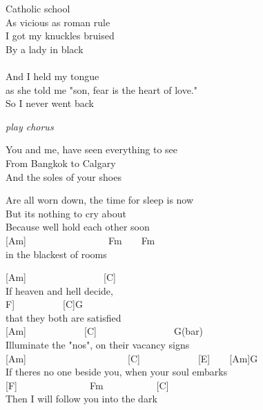 \documentclass[
  letterpaper,
  a5paper]{memoir}
\begin{document}
Catholic school\\
As vicious as roman rule\\
I got my knuckles bruised\\
By a lady in black\\
\hspace*{0.333em}\hspace*{0.333em}\hspace*{0.333em}\hspace*{0.333em}\hspace*{0.333em}\\
And I held my tongue\\
as she told me "son, fear is the heart of love."\\
So I never went back

\emph{play chorus}

You and me, have seen everything to see\\
From Bangkok to Calgary~~\\
And the soles of your shoes

Are all worn down, the time for sleep is now\\
But it\textquotesingle s nothing to cry about~~\\
Because we\textquotesingle ll hold each other soon\\
{[}Am{]}~~~~~~~~~~~~~~~~~Fm~~~~Fm\\
in the blackest of rooms

{[}Am{]}~~~~~~~~~~~~~~~~{[}C{]}~~~~\\
If heaven and hell decide,\\
\hspace*{0.333em}\hspace*{0.333em}\hspace*{0.333em}\hspace*{0.333em}\hspace*{0.333em}\hspace*{0.333em}\hspace*{0.333em}\hspace*{0.333em}\hspace*{0.333em}\hspace*{0.333em}{[}F{]}~~~~~~~~~~{[}C{]}G\\
that they both are satisfied\\
{[}Am{]}~~~~~~~~~~~~{[}C{]}~~~~~~~~~~~~~~~~G(bar)\\
Illuminate the "no\textquotesingle s", on their vacancy signs\\
{[}Am{]}~~~~~~~~~~~~~~~~~~~~~{[}C{]}~~~~~~~~~~~~{[}E{]}~~~~{[}Am{]}G\\
If there\textquotesingle s no one beside you, when your soul embarks\\
{[}F{]}~~~~~~~~~~~~~~~Fm~~~~~~~~~~~{[}C{]}~~~\\
Then I will follow you into the dark
\end{document}
